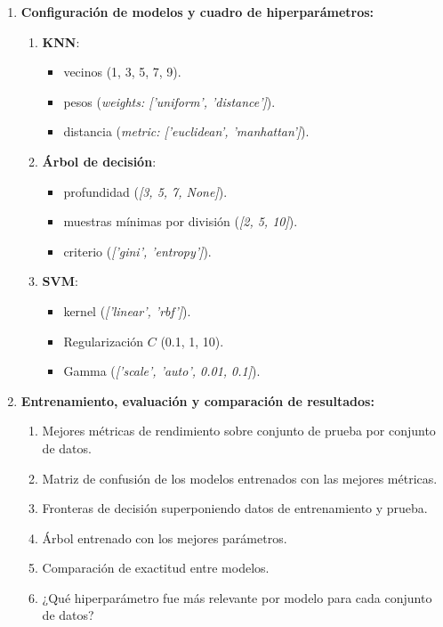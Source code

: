 \begin{enumerate}
    \item \textbf{Configuración de modelos y cuadro de hiperparámetros:}
          \begin{enumerate}
              \item \textbf{KNN}:
                    \begin{itemize}
                        \item vecinos (1, 3, 5, 7, 9).
                        \item pesos (\textit{weights: ['uniform', 'distance']}).
                        \item distancia (\textit{metric: ['euclidean', 'manhattan']}).
                    \end{itemize}
              \item \textbf{Árbol de decisión}:
                    \begin{itemize}
                        \item profundidad (\textit{[3, 5, 7, None]}).
                        \item muestras mínimas por división (\textit{[2, 5, 10]}).
                        \item criterio (\textit{['gini', 'entropy']}).
                    \end{itemize}
              \item \textbf{SVM}:
                    \begin{itemize}
                        \item kernel (\textit{['linear', 'rbf']}).
                        \item Regularización $C$ (0.1, 1, 10).
                        \item Gamma (\textit{['scale', 'auto', 0.01, 0.1]}).
                    \end{itemize}
          \end{enumerate}

    \item \textbf{Entrenamiento, evaluación y comparación de resultados:}
          \begin{enumerate}
              \item Mejores métricas de rendimiento sobre conjunto de prueba
                    por conjunto de datos.
              \item Matriz de confusión de los modelos entrenados con las
                    mejores métricas.
              \item Fronteras de decisión superponiendo datos de entrenamiento
                    y prueba.
              \item Árbol entrenado con los mejores parámetros.
              \item Comparación de exactitud entre modelos.
              \item ¿Qué hiperparámetro fue más relevante por modelo para cada
                    conjunto de datos?
          \end{enumerate}
\end{enumerate}
